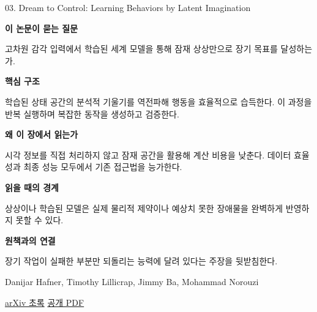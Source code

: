 \documentclass[11pt,openany]{book}
\begin{document}
\begin{termcard}{03. Dream to Control: Learning Behaviors by Latent Imagination}

\par

\medskip

{\sffamily\bfseries\color{deepblue} 이 논문이 묻는 질문}\par

고차원 감각 입력에서 학습된 세계 모델을 통해 잠재 상상만으로 장기 목표를 달성하는가.

\smallskip

{\sffamily\bfseries\color{deepblue} 핵심 구조}\par

학습된 상태 공간의 분석적 기울기를 역전파해 행동을 효율적으로 습득한다. 이 과정을 반복 실행하며 복잡한 동작을 생성하고 검증한다.

\smallskip

{\sffamily\bfseries\color{deepblue} 왜 이 장에서 읽는가}\par

시각 정보를 직접 처리하지 않고 잠재 공간을 활용해 계산 비용을 낮춘다. 데이터 효율성과 최종 성능 모두에서 기존 접근법을 능가한다.

\smallskip

{\sffamily\bfseries\color{coral} 읽을 때의 경계}\par

상상이나 학습된 모델은 실제 물리적 제약이나 예상치 못한 장애물을 완벽하게 반영하지 못할 수 있다.

\smallskip

{\sffamily\bfseries\color{teal} 원책과의 연결}\par

장기 작업이 실패한 부분만 되돌리는 능력에 달려 있다는 주장을 뒷받침한다.

\medskip

{\footnotesize\color{muted} Danijar Hafner, Timothy Lillicrap, Jimmy Ba, Mohammad Norouzi\par

\href{https://arxiv.org/abs/1912.01603}{arXiv 초록} \quad \href{https://arxiv.org/pdf/1912.01603}{공개 PDF}\par}

\end{termcard}
\end{document}
